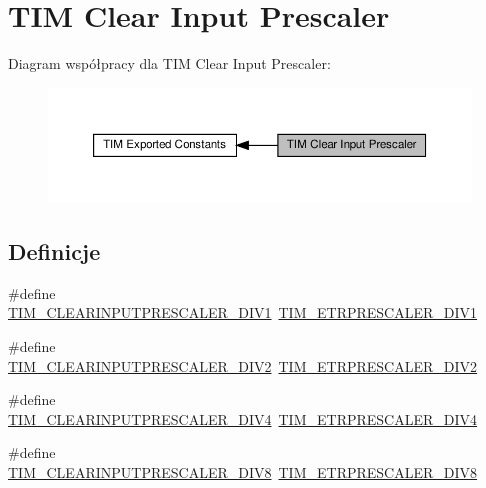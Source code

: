 \hypertarget{group___t_i_m___clear_input___prescaler}{}\section{T\+IM Clear Input Prescaler}
\label{group___t_i_m___clear_input___prescaler}
Diagram współpracy dla T\+IM Clear Input Prescaler\+:\nopagebreak
\begin{figure}[H]
\begin{center}
\leavevmode
\includegraphics[width=350pt]{group___t_i_m___clear_input___prescaler}
\end{center}
\end{figure}
\subsection*{Definicje}
\begin{DoxyCompactItemize}
\item 
\#define \hyperlink{group___t_i_m___clear_input___prescaler_gaf88d719dd5535b6b58275549c4512ec7}{T\+I\+M\+\_\+\+C\+L\+E\+A\+R\+I\+N\+P\+U\+T\+P\+R\+E\+S\+C\+A\+L\+E\+R\+\_\+\+D\+I\+V1}~\hyperlink{group___t_i_m___e_t_r___prescaler_gabead5364c62645592e42545ba09ab88a}{T\+I\+M\+\_\+\+E\+T\+R\+P\+R\+E\+S\+C\+A\+L\+E\+R\+\_\+\+D\+I\+V1}
\item 
\#define \hyperlink{group___t_i_m___clear_input___prescaler_gae54b2f4ea04ef97f7c75755347edc8ba}{T\+I\+M\+\_\+\+C\+L\+E\+A\+R\+I\+N\+P\+U\+T\+P\+R\+E\+S\+C\+A\+L\+E\+R\+\_\+\+D\+I\+V2}~\hyperlink{group___t_i_m___e_t_r___prescaler_gaf7fe49f67bdb6b33b9b41953fee75680}{T\+I\+M\+\_\+\+E\+T\+R\+P\+R\+E\+S\+C\+A\+L\+E\+R\+\_\+\+D\+I\+V2}
\item 
\#define \hyperlink{group___t_i_m___clear_input___prescaler_gae3c3dea810bb9d83b532737f01a3213d}{T\+I\+M\+\_\+\+C\+L\+E\+A\+R\+I\+N\+P\+U\+T\+P\+R\+E\+S\+C\+A\+L\+E\+R\+\_\+\+D\+I\+V4}~\hyperlink{group___t_i_m___e_t_r___prescaler_gaa09da30c3cd28f1fe6b6f3f599a5212c}{T\+I\+M\+\_\+\+E\+T\+R\+P\+R\+E\+S\+C\+A\+L\+E\+R\+\_\+\+D\+I\+V4}
\item 
\#define \hyperlink{group___t_i_m___clear_input___prescaler_ga34bc6cb7ee8800cc48b1ee6c536859cc}{T\+I\+M\+\_\+\+C\+L\+E\+A\+R\+I\+N\+P\+U\+T\+P\+R\+E\+S\+C\+A\+L\+E\+R\+\_\+\+D\+I\+V8}~\hyperlink{group___t_i_m___e_t_r___prescaler_ga834e38200874cced108379b17a24d0b7}{T\+I\+M\+\_\+\+E\+T\+R\+P\+R\+E\+S\+C\+A\+L\+E\+R\+\_\+\+D\+I\+V8}
\end{DoxyCompactItemize}


